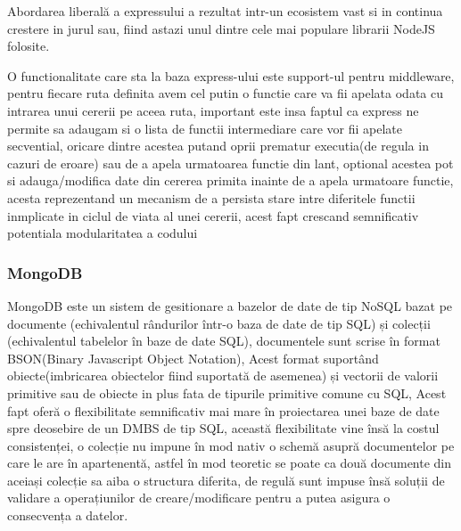 \documentclass[12pt,a4paper,hidelinks]{report}
\theoremstyle{definition}
\theoremstyle{remark}
\begin{document}
Abordarea liberală a expressului a rezultat intr-un ecosistem vast si in continua crestere in jurul sau, fiind astazi unul dintre cele mai populare librarii NodeJS folosite.

O functionalitate care sta la baza express-ului este support-ul pentru middleware, pentru fiecare ruta definita avem cel putin o functie care va fii apelata odata cu intrarea
unui cererii pe aceea ruta,
important este insa faptul ca express ne permite sa adaugam si o lista de functii intermediare care vor fii apelate secvential, oricare dintre acestea putand oprii prematur executia(de regula in cazuri de eroare) 
sau de a apela urmatoarea functie din lant, optional acestea pot si adauga/modifica date din cererea primita inainte de a apela urmatoare functie, 
acesta reprezentand un mecanism de a persista stare intre diferitele functii inmplicate in ciclul de viata al unei cererii, acest fapt crescand semnificativ potentiala modularitatea a codului
\subsubsection{MongoDB}
MongoDB este un sistem de gesitionare a bazelor de date de tip NoSQL bazat pe documente
(echivalentul rândurilor într-o baza de date de tip SQL) și colecții (echivalentul tabelelor în baze de date SQL), 
documentele sunt scrise în format BSON(Binary Javascript Object Notation), 
Acest format suportând obiecte(imbricarea obiectelor fiind suportată de asemenea) și vectorii 
de valorii primitive sau de obiecte in plus fata de tipurile primitive comune cu SQL, 
Acest fapt oferă o flexibilitate semnificativ mai mare în proiectarea 
unei baze de date spre deosebire de un DMBS de tip SQL, 
această flexibilitate vine însă la costul consistenței, o colecție nu impune 
în mod nativ o schemă asupră documentelor pe care le are în apartenentă, 
astfel în mod teoretic se poate ca două documente din aceiași colecție sa aiba o structura diferita, 
de regulă sunt impuse însă soluții de validare a operațiunilor de creare/modificare 
pentru a putea asigura o consecvența a datelor.
\end{document}
